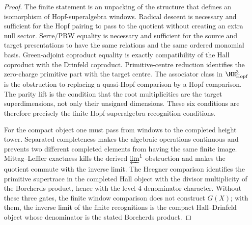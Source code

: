 \begin{proof}
The finite statement is an unpacking of the structure that defines an
isomorphism of Hopf-superalgebra windows. Radical descent is necessary
and sufficient for the Hopf pairing to pass to the quotient without
creating an extra null sector. Serre/PBW equality is necessary and
sufficient for the source and target presentations to have the same
relations and the same ordered monomial basis. Green-adjoint coproduct
equality is exactly compatibility of the Hall coproduct with the
Drinfeld coproduct. Primitive-centre reduction identifies the
zero-charge primitive part with the target centre. The associator class
in \(\HH^3_{\mathrm{Hopf}}\) is the obstruction to replacing a
quasi-Hopf comparison by a Hopf comparison. The parity lift is the
condition that the root multiplicities are the target superdimensions,
not only their unsigned dimensions. These six conditions are therefore
precisely the finite Hopf-superalgebra recognition conditions.

For the compact object one must pass from windows to the completed
height tower. Separated completeness makes the algebraic operations
continuous and prevents two different completed elements from having the
same finite image. Mittag--Leffler exactness kills the derived
\(\varprojlim^1\) obstruction and makes the quotient commute with the
inverse limit. The Heegner comparison identifies the primitive
supertrace in the completed Hall object with the divisor multiplicity
of the Borcherds product, hence with the level-\(4\) denominator
character. Without these three gates, the finite window comparison
does not construct \(G(X)\); with them, the inverse limit of the finite
recognitions is the compact Hall--Drinfeld object whose denominator is
the stated Borcherds product.
\end{proof}

